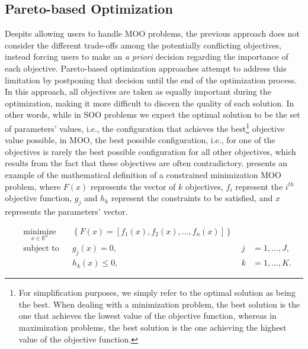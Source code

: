 	\subsection{Pareto-based Optimization}
	\label{ssec:pareto}
	
	Despite allowing users to handle \ac{MOO} problems, the previous approach does not consider the different trade-offs among the potentially conflicting objectives, instead forcing users to make an \textit{a priori} decision regarding the importance of each objective. Pareto-based optimization approaches attempt to address this limitation by postponing that decision until the end of the optimization process. In this approach, all objectives are taken as equally important during the optimization, making it more difficult to discern the quality of each solution. In other words, while in \ac{SOO} problems we expect the optimal solution to be the set of parameters' values, i.e., the configuration that achieves the best\footnote{For simplification purposes, we simply refer to the optimal solution as being the best. When dealing with a minimization problem, the best solution is the one that achieves the lowest value of the objective function, whereas in maximization problems, the best solution is the one achieving the highest value of the objective function.} objective value possible, in \ac{MOO}, the best possible configuration, i.e.,  for one of the objectives is rarely the best possible configuration for all other objectives, which results from the fact that these objectives are often contradictory.  presents an example of the mathematical definition of a constrained minimization \ac{MOO} problem, where $F(x)$ represents the vector of $k$ objectives, $f_i$ represent the $i^{th}$ objective function, $g_j$ and $h_k$ represent the constraints to be satisfied, and $x$ represents the parameters' vector.
	
	\begin{equation} \label{eq:pareto-based}
	\begin{aligned}
	& \underset{x \in \mathbb{R}^n}{\text{minimize}}
	& & \left\lbrace F(x) = \left[f_1(x), f_2(x), ..., f_n(x)\right]  \right\rbrace \\
	& \text{subject to}
	& & g_j(x) = 0, & \; j &= 1, \ldots, J, \\ 
	&&& h_k(x) \leq 0, & \; k &= 1, \ldots, K.
	\end{aligned}
	\end{equation}
	
